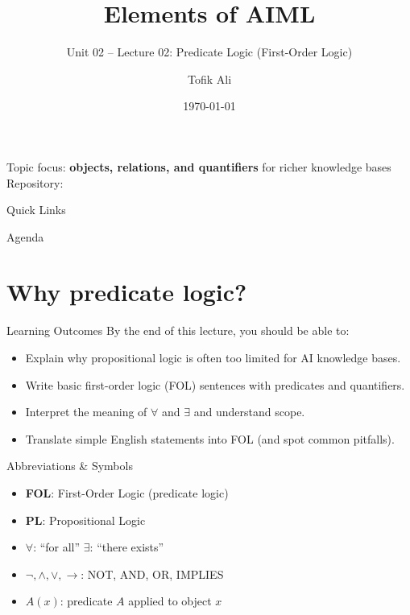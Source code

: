 \documentclass[aspectratio=169]{beamer}
\title[Elements of AIML]{Elements of AIML}
\subtitle{Unit 02 -- Lecture 02: Predicate Logic (First-Order Logic)}
\author{Tofik Ali}
\institute{School of Computer Science, UPES Dehradun}
\date{\today}
\begin{document}
\UPESCoverFrame
\setcounter{framenumber}{0}

\begin{frame}
  \titlepage
  \vspace{0.3em}
  \begin{center}
    \footnotesize Topic focus: \textbf{objects, relations, and quantifiers} for richer knowledge bases\\[0.25em]
    \footnotesize Repository: \texttt{\AIMLRepoURL}
  \end{center}
  \slidesources{\AIMLUnitIISources}
\end{frame}

\begin{frame}{Quick Links}
  \centering
  \hyperlink{sec:why}{}\hspace{0.6em}
  \hyperlink{sec:syntax}{}\hspace{0.6em}
  \hyperlink{sec:sem}{}\hspace{0.6em}
  \hyperlink{sec:translate}{}\hspace{0.6em}
  \hyperlink{sec:summary}{}
\end{frame}

\begin{frame}{Agenda}
  \tableofcontents
\end{frame}

\section{Why predicate logic?}
\label{sec:why}

\begin{frame}{Learning Outcomes}
  By the end of this lecture, you should be able to:
  \begin{itemize}[<+->]
    \item Explain why propositional logic is often too limited for AI knowledge bases.
    \item Write basic first-order logic (FOL) sentences with predicates and quantifiers.
    \item Interpret the meaning of $\forall$ and $\exists$ and understand scope.
    \item Translate simple English statements into FOL (and spot common pitfalls).
  \end{itemize}
\end{frame}

\begin{frame}{Abbreviations \& Symbols}
  \begin{itemize}[<+->]
    \item \textbf{FOL}: First-Order Logic (predicate logic)
    \item \textbf{PL}: Propositional Logic
    \item $\forall$: ``for all'' \hspace{1.2em} $\exists$: ``there exists''
    \item $\lnot,\land,\lor,\rightarrow$: NOT, AND, OR, IMPLIES
    \item $A(x)$: predicate $A$ applied to object $x$
  \end{itemize}
\end{frame}
\end{document}
